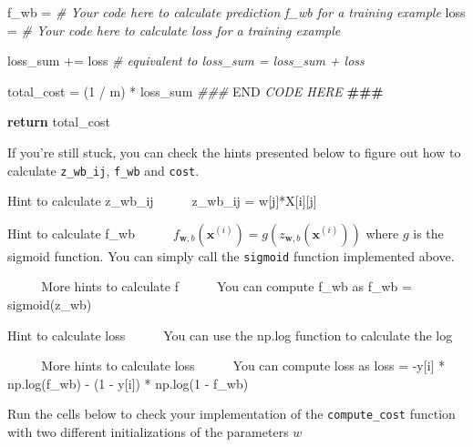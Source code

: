 \documentclass[11pt]{article}
\newenvironment{Shaded}{}{}
\newcommand{\DecValTok}[1]{\textcolor[rgb]{0.25,0.63,0.44}{{#1}}}
\newcommand{\CommentTok}[1]{\textcolor[rgb]{0.38,0.63,0.69}{\textit{{#1}}}}
\newcommand{\AlertTok}[1]{\textcolor[rgb]{1.00,0.00,0.00}{\textbf{{#1}}}}
\newcommand{\RegionMarkerTok}[1]{{#1}}
\newcommand{\NormalTok}[1]{{#1}}
\newcommand{\ControlFlowTok}[1]{\textcolor[rgb]{0.00,0.44,0.13}{\textbf{{#1}}}}
\newcommand{\OperatorTok}[1]{\textcolor[rgb]{0.40,0.40,0.40}{{#1}}}
\begin{document}
\begin{itemize}
\begin{Shaded}
\begin{Highlighting}[]
\NormalTok{         f\_wb }\OperatorTok{=} \CommentTok{\# Your code here to calculate prediction f\_wb for a training example}
\NormalTok{         loss }\OperatorTok{=}  \CommentTok{\# Your code here to calculate loss for a training example}

\NormalTok{         loss\_sum }\OperatorTok{+=}\NormalTok{ loss }\CommentTok{\# equivalent to loss\_sum = loss\_sum + loss}

\NormalTok{     total\_cost }\OperatorTok{=}\NormalTok{ (}\DecValTok{1} \OperatorTok{/}\NormalTok{ m) }\OperatorTok{*}\NormalTok{ loss\_sum  }
     \CommentTok{\#\#\# }\RegionMarkerTok{END}\CommentTok{ CODE HERE }\AlertTok{\#\#\#}\CommentTok{ }

     \ControlFlowTok{return}\NormalTok{ total\_cost}
\end{Highlighting}
\end{Shaded}

  If you're still stuck, you can check the hints presented below to
  figure out how to calculate \texttt{z\_wb\_ij}, \texttt{f\_wb} and
  \texttt{cost}.

  Hint to calculate z\_wb\_ij     z\_wb\_ij = w{[}j{]}*X{[}i{]}{[}j{]}

  Hint to calculate f\_wb    
  \(f_{\mathbf{w},b}(\mathbf{x}^{(i)}) = g(z_{\mathbf{w},b}(\mathbf{x}^{(i)}))\)
  where \(g\) is the sigmoid function. You can simply call the
  \texttt{sigmoid} function implemented above.

      More hints to calculate f     You can compute f\_wb as f\_wb =
  sigmoid(z\_wb)

  Hint to calculate loss     You can use the np.log function to
  calculate the log

      More hints to calculate loss     You can compute loss as loss =
  -y{[}i{]} * np.log(f\_wb) - (1 - y{[}i{]}) * np.log(1 - f\_wb)
\end{itemize}

    Run the cells below to check your implementation of the
\texttt{compute\_cost} function with two different initializations of
the parameters \(w\)
\end{document}
